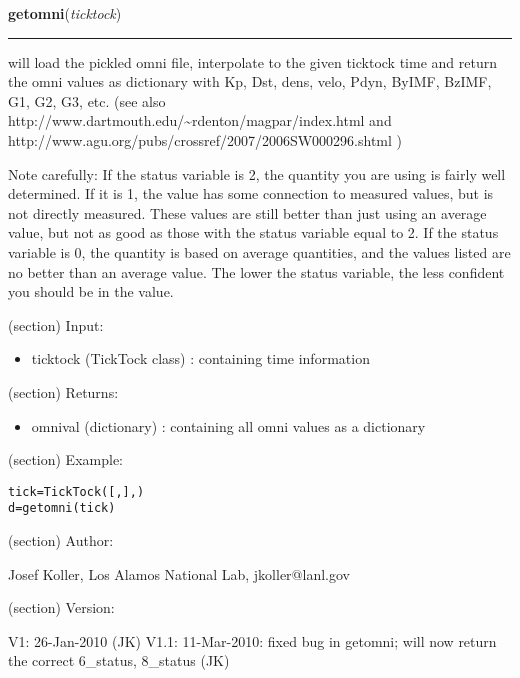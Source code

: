 \hspace{.8\funcindent}\begin{boxedminipage}{\funcwidth}

    \raggedright \textbf{getomni}(\textit{ticktock})

    \vspace{-1.5ex}

    \rule{\textwidth}{0.5\fboxrule}
\setlength{\parskip}{2ex}
    will load the pickled omni file, interpolate to the given ticktock time
    and return the omni values as dictionary with Kp, Dst, dens, velo, 
    Pdyn, ByIMF, BzIMF, G1, G2, G3, etc. (see also 
    http://www.dartmouth.edu/{\textasciitilde}rdenton/magpar/index.html and
    http://www.agu.org/pubs/crossref/2007/2006SW000296.shtml )

    Note carefully: If the status variable is 2, the quantity you are using
    is fairly well determined. If it is 1, the value has some connection to
    measured values, but is not directly measured. These values are still 
    better than just using an average value, but not as good as those with 
    the status variable equal to 2. If the status variable is 0, the 
    quantity is based on average quantities, and the values listed are no 
    better than an average value. The lower the status variable, the less 
    confident you should be in the value.

    (section) Input:

      \begin{itemize}
      \setlength{\parskip}{0.6ex}
        \item ticktock (TickTock class) : containing time information

      \end{itemize}

    (section) Returns:

      \begin{itemize}
      \setlength{\parskip}{0.6ex}
        \item omnival (dictionary) : containing all omni values as a dictionary

      \end{itemize}

    (section) Example:

\begin{alltt}
\pysrcprompt{{\textgreater}{\textgreater}{\textgreater} }tick = TickTock([, ], )
\pysrcprompt{{\textgreater}{\textgreater}{\textgreater} }d = getomni(tick)\end{alltt}
    (section) Author:

      Josef Koller, Los Alamos National Lab, jkoller@lanl.gov

    (section) Version:

      V1: 26-Jan-2010 (JK) V1.1: 11-Mar-2010: fixed bug in getomni; will 
      now return the correct 6\_status, 8\_status (JK)

\setlength{\parskip}{1ex}
    \end{boxedminipage}

